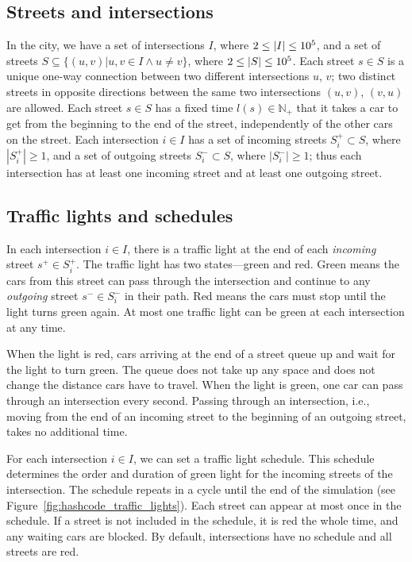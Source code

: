 \subsection{Streets and intersections}

In the city, we have a set of intersections
$I$, where $2 \leq \left|{I}\right| \leq 10^5$,
and a set of streets
$S \subseteq \{(u, v) | u,v \in I \land u \neq v\}$, where $2 \leq \left|{S}\right| \leq 10^5$.
Each street $s \in S$ is a unique one-way connection between two different intersections $u$, $v$; two distinct streets in opposite directions between the same two intersections $(u, v)$, $(v, u)$ are allowed. Each street $s \in S$ has a fixed time $l(s) \in \mathbb{N}_+$ that it takes a car to get from the beginning to the end of the street, independently of the other cars on the street.
Each intersection $i \in I$ has a set of incoming streets $S_i^+ \subset S$, where $|S_i^+| \geq 1$, and a set of outgoing streets $S_i^- \subset S$, where $|S_i^-| \geq 1$; thus each intersection has at least one incoming street and at least one outgoing street.

\subsection{Traffic lights and schedules}

In each intersection $i \in I$, there is a traffic light at the end of each \textit{incoming} street $s^+ \in S_i^+$. The traffic light has two states---green and red. Green means the cars from this street can pass through the intersection and continue to any \textit{outgoing} street $s^- \in S_i^-$ in their path. Red means the cars must stop until the light turns green again. At most one traffic light can be green at each intersection at any time.

When the light is red, cars arriving at the end of a street queue up and wait for the light to turn green. The queue does not take up any space and does not change the distance cars have to travel. When the light is green, one car can pass through an intersection every second. Passing through an intersection, i.e., moving from the end of an incoming street to the beginning of an outgoing street, takes no additional time.

For each intersection $i \in I$, we can set a traffic light schedule. This schedule determines the order and duration of green light for the incoming streets of the intersection. The schedule repeats in a cycle until the end of the simulation (see Figure~\ref{fig:hashcode_traffic_lights}). Each street can appear at most once in the schedule. If a street is not included in the schedule, it is red the whole time, and any waiting cars are blocked. By default, intersections have no schedule and all streets are red.

